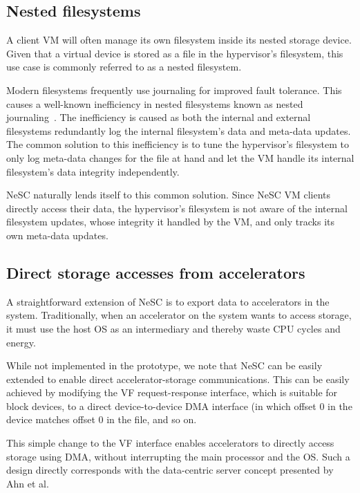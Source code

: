 \subsection*{Nested filesystems}
A client VM will often manage its own filesystem inside its nested storage device. Given that a virtual device is stored as a file in the hypervisor's filesystem, this use case is commonly referred to as a nested filesystem.

Modern filesystems frequently use journaling for improved fault tolerance. This causes a well-known inefficiency in nested filesystems known as nested journaling~\cite{le12nested}. The inefficiency is caused as both the internal and external filesystems redundantly log the internal filesystem's data and meta-data updates. The common solution to this inefficiency is to tune the hypervisor's filesystem to only log meta-data changes for the file at hand and let the VM handle its internal filesystem's data integrity independently.

NeSC naturally lends itself to this common solution. Since NeSC VM clients directly access their data, the hypervisor's filesystem is not aware of the internal filesystem updates, whose integrity it handled by the VM, and only tracks its own meta-data updates.

\subsection*{Direct storage accesses from accelerators}

A straightforward extension of NeSC is to export data to accelerators in the system.
Traditionally, when an accelerator on the system wants to access storage, it must use the host OS as an intermediary and thereby waste CPU cycles and energy.

While not implemented in the prototype, we note that NeSC can be easily extended to enable direct accelerator-storage communications. This can be easily achieved by modifying the VF request-response interface, which is suitable for block devices, to a direct device-to-device DMA interface (in which offset 0 in the device matches offset 0 in the file, and so on.

This simple change to the VF interface enables accelerators to directly access storage using DMA, without interrupting the main processor and the OS. Such a design directly corresponds with the data-centric server concept presented by Ahn et al.~\cite{ahn2015dcs}

